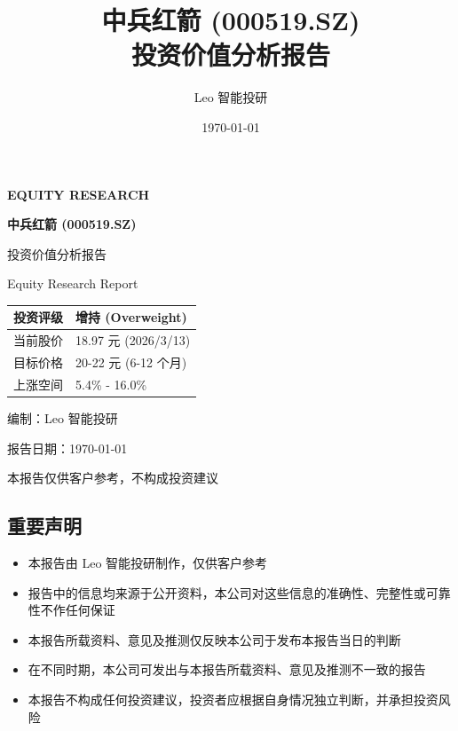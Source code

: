 \documentclass[a4paper,11pt]{article}
\title{\textbf{\Huge 中兵红箭 (000519.SZ) \\[0.5em] 投资价值分析报告}}
\author{Leo 智能投研}
\date{\today}
\begin{document}
\begin{titlepage}
    \centering
    \vspace*{2cm}
    
    {\color{primary}\Huge\bfseries EQUITY RESEARCH\par}
    
    \vspace{2cm}
    
    {\Huge\bfseries 中兵红箭 (000519.SZ)\par}
    \vspace{0.5cm}
    {\Large 投资价值分析报告\par}
    \vspace{0.5cm}
    {\large Equity Research Report\par}
    
    \vspace{2cm}
    
    \begin{tabular}{|l|l|}
        \hline
        \rowcolor{lightbg}
        \textbf{投资评级} & \textbf{\color{primary}增持 (Overweight)} \\
        \hline
        当前股价 & 18.97 元 (2026/3/13) \\
        \hline
        目标价格 & 20-22 元 (6-12 个月) \\
        \hline
        上涨空间 & 5.4\% - 16.0\% \\
        \hline
    \end{tabular}
    
    \vspace{2cm}
    
    {\large 编制：Leo 智能投研\par}
    {\large 报告日期：\today\par}
    
    \vfill
    
    {\small 本报告仅供客户参考，不构成投资建议\par}
\end{titlepage}

\begin{center}
    \section*{重要声明}
\end{center}
\begin{itemize}[leftmargin=*]
    \item 本报告由 Leo 智能投研制作，仅供客户参考
    \item 报告中的信息均来源于公开资料，本公司对这些信息的准确性、完整性或可靠性不作任何保证
    \item 本报告所载资料、意见及推测仅反映本公司于发布本报告当日的判断
    \item 在不同时期，本公司可发出与本报告所载资料、意见及推测不一致的报告
    \item 本报告不构成任何投资建议，投资者应根据自身情况独立判断，并承担投资风险
\end{itemize}
\end{document}
